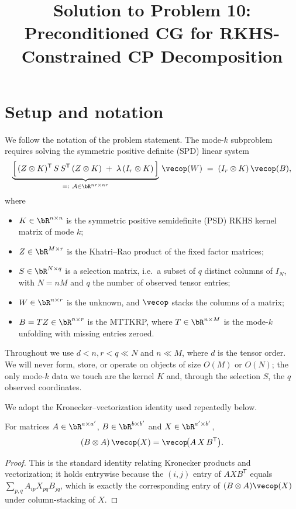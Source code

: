 

\title{Solution to Problem 10:\\ Preconditioned CG for RKHS-Constrained CP Decomposition}
\author{}
\date{}


\maketitle

\section{Setup and notation}

We follow the notation of the problem statement. The mode-$k$ subproblem requires
solving the symmetric positive definite (SPD) linear system
\begin{equation}\label{eq:system}
  \underbrace{\Big[\,(Z\otimes K)^{\mathsf T}\,S\,S^{\mathsf T}\,(Z\otimes K)
        \;+\;\lambda\,(I_r\otimes K)\,\Big]}_{=:~\mathcal A\in\bR^{nr\times nr}}\,
  \vecop(W)
  \;=\;(I_r\otimes K)\,\vecop(B),
\end{equation}
where
\begin{itemize}\setlength\itemsep{0.2em}
  \item $K\in\bR^{n\times n}$ is the symmetric positive semidefinite (PSD) RKHS kernel
        matrix of mode $k$;
  \item $Z\in\bR^{M\times r}$ is the Khatri--Rao product of the fixed factor matrices;
  \item $S\in\bR^{N\times q}$ is a selection matrix, i.e.\ a subset of $q$ distinct
        columns of $I_N$, with $N=nM$ and $q$ the number of observed tensor entries;
  \item $W\in\bR^{n\times r}$ is the unknown, and $\vecop$ stacks the columns of a matrix;
  \item $B=TZ\in\bR^{n\times r}$ is the MTTKRP, where $T\in\bR^{n\times M}$ is the
        mode-$k$ unfolding with missing entries zeroed.
\end{itemize}
Throughout we use $d<n,r<q\ll N$ and $n\ll M$, where $d$ is the tensor order.
We will never form, store, or operate on objects of size $O(M)$ or $O(N)$; the only
mode-$k$ data we touch are the kernel $K$ and, through the selection $S$, the
$q$ observed coordinates.

We adopt the Kronecker--vectorization identity used repeatedly below.

\begin{lemma}\label{lem:kronvec}
For matrices $A\in\bR^{a\times a'}$, $B\in\bR^{b\times b'}$ and
$X\in\bR^{a'\times b'}$,
\[
  (B\otimes A)\,\vecop(X)=\vecop\!\big(A\,X\,B^{\mathsf T}\big).
\]
\end{lemma}
\begin{proof}
This is the standard identity relating Kronecker products and vectorization; it holds
entrywise because the $(i,j)$ entry of $AXB^{\mathsf T}$ equals
$\sum_{p,q}A_{ip}X_{pq}B_{jq}$, which is exactly the corresponding entry of
$(B\otimes A)\vecop(X)$ under column-stacking of $X$.
\end{proof}

